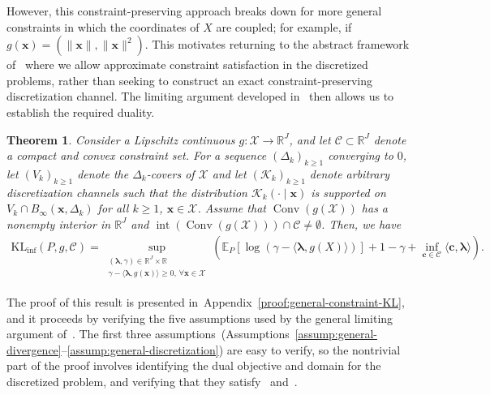 \documentclass{article}
\theoremstyle{plain}
\newtheorem{theorem}{Theorem}[section]
\theoremstyle{definition}
\newcommand{\lrp}[1]{\left( #1 \right)}
\newcommand{\KLinf}{\operatorname{KL_{inf}}}
\newcommand{\R}{\mathbb{R}}
\newcommand{\calC}{\mathcal C}
\newcommand{\calX}{\mathcal X}
\newcommand{\calK}{\mathcal{K}}
\newcommand{\cvec}{\mathbf{c}}
\newcommand{\xvec}{\mathbf{x}}
\newcommand{\boldlambda}{\boldsymbol{\lambda}}
\begin{document}
However, this constraint-preserving approach breaks down for more general constraints in which the coordinates of $X$ are coupled; for example, if $g(\xvec) = (\|\xvec\|, \|\xvec\|^2)$. This motivates returning to the abstract framework of~ where we allow approximate constraint satisfaction in the discretized problems, rather than seeking to construct an exact constraint-preserving discretization channel. The limiting argument developed in~ then allows us to establish the required duality. 
\begin{theorem}
    \label{theorem:general-constraint-KL} Consider a  Lipschitz continuous $g:\calX \to \R^J$, and let $\calC \subset \R^J$ denote a compact and convex constraint set. For a sequence $(\Delta_k)_{k \geq 1}$ converging to $0$, let $(V_k)_{k \geq 1}$ denote the $\Delta_k$-covers of $\calX$ and let $(\calK_k)_{k \geq 1}$ denote arbitrary discretization channels such that the distribution $\calK_k(\cdot \mid \xvec)$ is supported on $V_k \cap B_\infty(\xvec, \Delta_k)$ for all $k \geq 1$, $\xvec \in \calX$. Assume that $\operatorname{Conv}(g(\calX))$ has a nonempty interior in $\R^J$ and $\operatorname{int}\left(\operatorname{Conv}(g(\calX))\right) \cap \calC \not =  \emptyset$. Then, we have 
    \begin{align}
        \KLinf(P, g, \calC)  = \sup_{\substack{(\boldlambda, \gamma) \in \R^J \times \R \\ \gamma - \langle \boldlambda, g(\xvec)\rangle \geq 0, \, \forall \xvec \in \calX}} 
        \lrp{
        \mathbb{E}_P[\log \lrp{\gamma - \langle \boldlambda, g(X) \rangle }] + 1 - \gamma + \inf_{\cvec \in \calC} \langle \cvec, \boldlambda \rangle
        }. 
    \end{align}
\end{theorem}
The proof of this result is presented in~Appendix~\ref{proof:general-constraint-KL}, and it proceeds by verifying the five assumptions used by the general limiting argument of~. The first three assumptions~(Assumptions~\ref{assump:general-divergence}--\ref{assump:general-discretization}) are easy to verify, so the nontrivial part of the proof involves identifying the dual objective and domain for the discretized problem, and verifying that they satisfy~ and~.  
\end{document}
